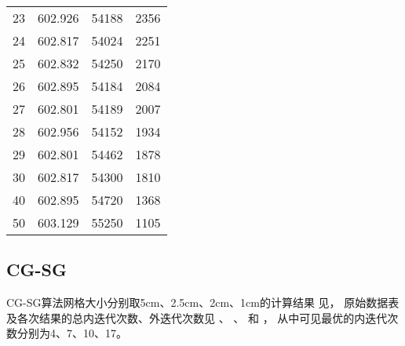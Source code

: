 \begin{datasheet}
\begin{table}
\begin{tabular}{cccc}
23 & 602.926 & 54188 & 2356 \\ %
24 & 602.817 & 54024 & 2251 \\ %
25 & 602.832 & 54250 & 2170 \\ %
26 & 602.895 & 54184 & 2084 \\ %
27 & 602.801 & 54189 & 2007 \\ %
28 & 602.956 & 54152 & 1934 \\ %
29 & 602.801 & 54462 & 1878 \\ %
30 & 602.817 & 54300 & 1810 \\ %
40 & 602.895 & 54720 & 1368 \\ %
50 & 603.129 & 55250 & 1105 \\ %
\bottomrule
\end{tabular}
\end{table}

\end{datasheet}


\subsection{CG-SG}
\label{sec:equsolve.iter.cg-sg}

CG-SG算法网格大小分别取5cm、2.5cm、2cm、1cm的计算结果
见，
原始数据表及各次结果的总内迭代次数、外迭代次数见
、%
、%
和%
，
从中可见最优的内迭代次数分别为4、7、10、17。

